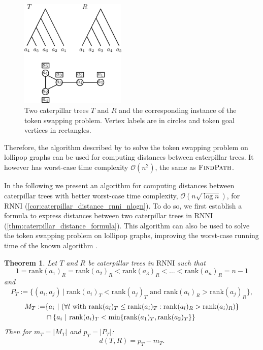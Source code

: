 \documentclass[11pt]{amsart}
\newtheorem{theorem}{Theorem}
\newcommand{\rnni}{\mathrm{RNNI}}
\newcommand{\findpath}{\textsc{FindPath}}
\newcommand{\rank}{\mathrm{rank}}
\renewcommand{\O}{\mathcal O}
\begin{document}
\begin{figure}[ht]
	\includegraphics[width=0.45\textwidth]{tsp_caterpillar.eps}
	\caption{Two caterpillar trees $T$ and $R$ and the corresponding instance of the token swapping problem.
	Vertex labels are in circles and token goal vertices in rectangles.}
	\label{fig:tsp_caterpillar}
\end{figure}

Therefore, the algorithm described by \textcite{Kawahara2017-ey} to solve the token swapping problem on lollipop graphs can be used for computing distances between caterpillar trees.
It however has worst-case time complexity $\O(n^2)$, the same as $\findpath$.

In the following we present an algorithm for computing distances between caterpillar trees with better worst-case time complexity, $\O(n \sqrt{\log n})$, for $\rnni$ (\autoref{cor:caterpillar_distance_rnni_nlogn}).
To do so, we first establish a formula to express distances between two caterpillar trees in $\rnni$ (\autoref{thm:caterpillar_distance_formula}).
This algorithm can also be used to solve the token swapping problem on lollipop graphs, improving the worst-case running time of the known algorithm \autocite{Kawahara2017-ey}.

\begin{theorem}
	Let $T$ and $R$ be caterpillar trees in $\rnni$ such that \[1 = \rank(a_1)_R = \rank(a_2)_R < \rank(a_3)_R < \ldots < \rank(a_n)_R = n-1\]
	and
	\[P_T := \{(a_i,a_j)\ |\  \rank(a_i)_T < \rank(a_j)_T \text{ and } \rank(a_i)_R > \rank(a_j)_R\},\]
	\begin{align*}
		M_T := &\{a_i\ |\  (\forall l \textnormal{ with } \rank(a_l)_T \leq \rank(a_i)_T: \rank(a_l)_R > \rank(a_i)_R)\} \\
		& \cap \{a_i \ |\  \rank(a_i)_T < \min\{\rank(a_1)_T, \rank(a_2)_T\}\}
	\end{align*}
	Then for ${m_T = |M_T|}$ and ${p_T = |P_T|}$:
	\[d(T,R) = p_T - m_T.\]
	\label{thm:caterpillar_distance_formula}
\end{theorem}
\end{document}
